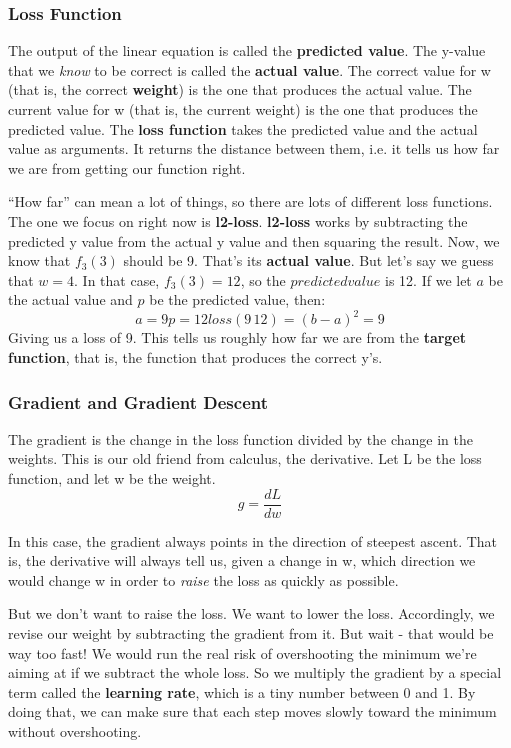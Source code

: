 \documentclass[11pt]{article}
\begin{document}
\subsubsection{Loss Function}
\label{sec:org7255193}
The output of the linear equation is called the \textbf{predicted value}. The y-value that we \emph{know} to be correct is called the \textbf{actual value}. The correct value for w (that is, the correct \textbf{weight}) is the one that produces the actual value. The current value for w (that is, the current weight) is the one that produces the predicted value.  The \textbf{loss function} takes the predicted value and the actual value as arguments. It returns the distance between them, i.e. it tells us how far we are from getting our function right.

``How far'' can mean a lot of things, so there are lots of different loss functions. The one we focus on right now is \textbf{l2-loss}. \textbf{l2-loss} works by subtracting the predicted y value from the actual y value and then squaring the result. Now, we know that \(f_3(3)\) should be 9. That's its \textbf{actual value}. But let's say we guess that \(w=4\). In that case, \(f_3(3) = 12\), so the \(predicted value\) is 12. If we let \(a\) be the actual value and \(p\) be the predicted value, then:
$$
a=9
p=12
loss(9\,12) = (b-a)^2
=9
$$
Giving us a loss of 9. This tells us roughly how far we are from the \textbf{target function}, that is, the function that produces the correct y's.
\subsubsection{Gradient and Gradient Descent}
\label{sec:org83f97d9}
The gradient is the change in the loss function divided by the change in the weights. This is our old friend from calculus, the derivative. Let L be the loss function, and let w be the weight.
$$
g = \frac{dL}{dw}
$$

In this case, the gradient always points in the direction of steepest ascent. That is, the derivative will always tell us, given a change in w, which direction we would change w in order to \emph{raise} the loss as quickly as possible.

But we don't want to raise the loss. We want to lower the loss. Accordingly, we revise our weight by subtracting the gradient from it. But wait - that would be way too fast! We would run the real risk of overshooting the minimum we're aiming at if we subtract the whole loss. So we multiply the gradient by a special term called the \textbf{learning rate}, which is a tiny number between 0 and 1. By doing that, we can make sure that each step moves slowly toward the minimum without overshooting.
\end{document}
